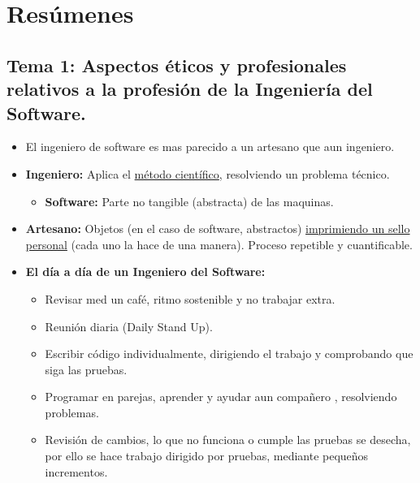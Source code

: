 \documentclass[12pt, twoside, openright]{report} %
\begin{document}






\part{Resúmenes}
\chapter{Tema 1: Aspectos éticos y profesionales relativos a la profesión
de la Ingeniería del Software.}

\begin{itemize}
\item El ingeniero de software es mas parecido a un artesano que aun
  ingeniero.
\item \textbf{Ingeniero:} Aplica el \underline{método científico},
  resolviendo un problema técnico.
  

  \begin{itemize}
  \item \textbf{Software:} Parte no tangible (abstracta) de las maquinas.
    
  \end{itemize}
\item \textbf{Artesano:} Objetos (en el caso de software, abstractos)
  \underline{imprimiendo un sello personal} (cada uno la hace de una
  manera). Proceso repetible y cuantificable.
  
\item \textbf{El día a día de un Ingeniero del Software:}
  

  \begin{itemize}
  \item Revisar med un café, ritmo sostenible y no trabajar extra.
    
  \item Reunión diaria (Daily Stand Up).
    
  \item Escribir código individualmente, dirigiendo el trabajo y comprobando
    que siga las pruebas.
    
  \item Programar en parejas, aprender y ayudar aun compañero , resolviendo
    problemas.
    
  \item Revisión de cambios, lo que no funciona o cumple las pruebas se
    desecha, por ello se hace trabajo dirigido por pruebas, mediante
    pequeños incrementos.
    

\end{itemize}
\end{itemize}
\end{document}
